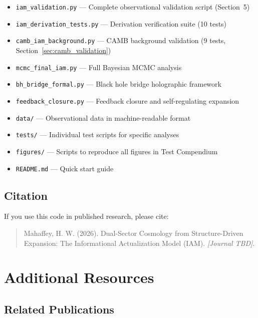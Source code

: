 \documentclass[11pt]{article}
\begin{document}
\begin{itemize}
    \item \texttt{iam\_validation.py} --- Complete observational validation script (Section~5)
    \item \texttt{iam\_derivation\_tests.py} --- Derivation verification suite (10 tests)
    \item \texttt{camb\_iam\_background.py} --- CAMB background validation (9 tests, Section~\ref{sec:camb_validation})
    \item \texttt{mcmc\_final\_iam.py} --- Full Bayesian MCMC analysis
    \item \texttt{bh\_bridge\_formal.py} --- Black hole bridge holographic framework
    \item \texttt{feedback\_closure.py} --- Feedback closure and self-regulating expansion
    \item \texttt{data/} --- Observational data in machine-readable format
    \item \texttt{tests/} --- Individual test scripts for specific analyses
    \item \texttt{figures/} --- Scripts to reproduce all figures in Test Compendium
    \item \texttt{README.md} --- Quick start guide
\end{itemize}

\subsection{Citation}

If you use this code in published research, please cite:

\begin{quote}
Mahaffey, H. W. (2026). Dual-Sector Cosmology from Structure-Driven Expansion: The Informational Actualization Model (IAM). \textit{[Journal TBD]}.
\end{quote}

\section{Additional Resources}

\subsection{Related Publications}
\end{document}
